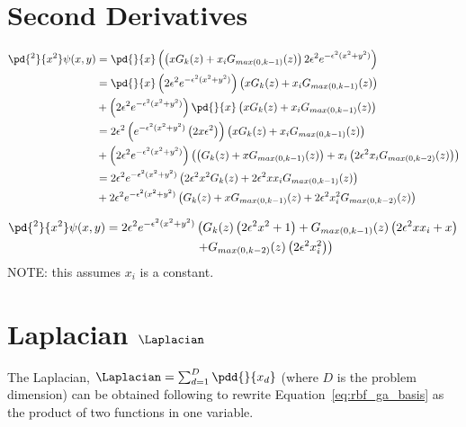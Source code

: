 \documentclass[11pt]{report}
\begin{document}
{\section{Second Derivatives}
\begin{align*}
\pd{^2}{x^2}\psi(x,y)   & = \pd{}{x} \left(\left( x G_k(z) + x_i G_{max(0,k-1)}( z )  \right) 2\epsilon^2 e^{-\epsilon^2(x^2 + y^2)}\right) \\
& = \pd{}{x}\left(  2\epsilon^2 e^{-\epsilon^2(x^2 + y^2)} \right) \left( x G_k(z) + x_i G_{max(0,k-1)}( z )  \right) \\ 
& + \left(  2\epsilon^2 e^{-\epsilon^2(x^2 + y^2)} \right) \pd{}{x} \left( x G_k(z) + x_i G_{max(0,k-1)}( z )  \right) \\
& =  2\epsilon^2 \left( e^{-\epsilon^2 (x^2 + y^2)} \left(2x \epsilon^2 \right) \right) \left( x G_k(z) + x_i G_{max(0,k-1)}( z )  \right) \\ 
& + \left(  2\epsilon^2 e^{-\epsilon^2(x^2 + y^2)} \right) \left( \left(G_k(z) + x G_{max(0,k-1)}(z) \right) + x_i \left( 2 \epsilon^2 x_i G_{max(0,k-2)}( z ) \right) \right) \\
& = 2 \epsilon^2 e^{-\epsilon^2(x^2 + y^2)} \left( 2 \epsilon^2 x^2 G_k(z) + 2 \epsilon^2 x x_i G_{max(0,k-1)}( z )  \right) \\ 
& + 2\epsilon^2 e^{-\epsilon^2(x^2 + y^2)} \left( G_k(z) + x G_{max(0,k-1)}(z) +  2 \epsilon^2 x_i^2 G_{max(0,k-2)}( z ) \right) 
\end{align*}

\begin{align}
\pd{^2}{x^2}\psi(x,y)  = 2 \epsilon^2 e^{-\epsilon^2(x^2 + y^2)} & \left( G_k(z) \left( 2 \epsilon^2 x^2 + 1 \right) +  G_{max(0,k-1)}(z) \left( 2 \epsilon^2 x x_i + x \right)  \right. \nonumber \\
& \left. + G_{max(0,k-2)}( z ) \left(2 \epsilon^2 x_i^2\right) \right)
\label{eq:second_x_product_rule}
\end{align}
NOTE: this assumes $x_i$ is a constant. 


\section{Laplacian $\Laplacian$}

The Laplacian, $\Laplacian = \sum_{d=1}^{D}  \pdd{}{x_d}$ (where $D$ is the problem dimension) can be obtained following \cite{Fornberg2012} to rewrite Equation~\ref{eq:rbf_ga_basis} as the product of two functions in one variable. 

}
\end{document}
